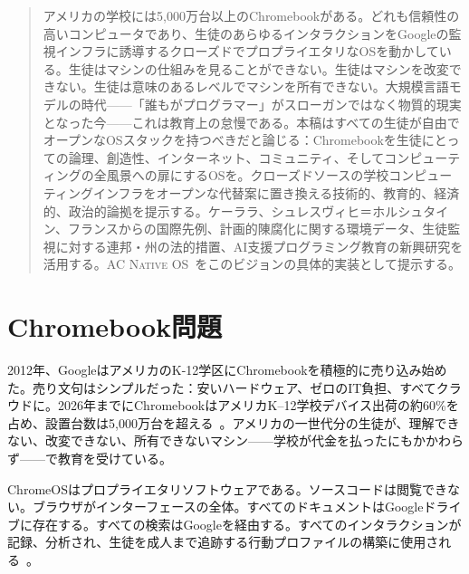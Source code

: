 \documentclass[11pt, a4paper]{article}
\newcommand{\acos}{\textsc{AC Native OS}}
\begin{document}
\begin{multicols}{2}


\begin{abstract}
\noindent
アメリカの学校には5,000万台以上のChromebookがある。どれも信頼性の高いコンピュータであり、生徒のあらゆるインタラクションをGoogleの監視インフラに誘導するクローズドでプロプライエタリなOSを動かしている。生徒はマシンの仕組みを見ることができない。生徒はマシンを改変できない。生徒は意味のあるレベルでマシンを所有できない。大規模言語モデルの時代——「誰もがプログラマー」がスローガンではなく物質的現実となった今——これは教育上の怠慢である。本稿はすべての生徒が自由でオープンなOSスタックを持つべきだと論じる：Chromebookを生徒にとっての論理、創造性、インターネット、コミュニティ、そしてコンピューティングの全風景への扉にするOSを。クローズドソースの学校コンピューティングインフラをオープンな代替案に置き換える技術的、教育的、経済的、政治的論拠を提示する。ケーララ、シュレスヴィヒ＝ホルシュタイン、フランスからの国際先例、計画的陳腐化に関する環境データ、生徒監視に対する連邦・州の法的措置、AI支援プログラミング教育の新興研究を活用する。\acos{}~\citep{scudder2026acos}をこのビジョンの具体的実装として提示する。
\end{abstract}


\section{Chromebook問題}

2012年、GoogleはアメリカのK-12学区にChromebookを積極的に売り込み始めた。売り文句はシンプルだった：安いハードウェア、ゼロのIT負担、すべてクラウドに。2026年までにChromebookはアメリカK--12学校デバイス出荷の約60\%を占め、設置台数は5,000万台を超える~\citep{google2024chromeos}。アメリカの一世代分の生徒が、理解できない、改変できない、所有できないマシン——学校が代金を払ったにもかかわらず——で教育を受けている。

ChromeOSはプロプライエタリソフトウェアである。ソースコードは閲覧できない。ブラウザがインターフェースの全体。すべてのドキュメントはGoogleドライブに存在する。すべての検索はGoogleを経由する。すべてのインタラクションが記録、分析され、生徒を成人まで追跡する行動プロファイルの構築に使用される~\citep{zuboff2019surveillance}。


\end{multicols}
\end{document}
